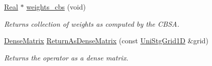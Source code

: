 \begin{DoxyCompactItemize}
\hyperlink{group__c01-roots_gac080bbbf5cbb5502c9f00405f894857d}{Real} $\ast$ \hyperlink{classmtk_1_1Grad1D_adde70cb7e4fd930f84121a4bcd7f2e37}{weights\-\_\-cbs} (void)
\begin{DoxyCompactList}\small\item\em Returns collection of weights as computed by the C\-B\-S\-A. \end{DoxyCompactList}\item 
\hyperlink{classmtk_1_1DenseMatrix}{Dense\-Matrix} \hyperlink{classmtk_1_1Grad1D_a75781c4455569a7934d4e0dff7e06064}{Return\-As\-Dense\-Matrix} (const \hyperlink{classmtk_1_1UniStgGrid1D}{Uni\-Stg\-Grid1\-D} \&grid)
\begin{DoxyCompactList}\small\item\em Returns the operator as a dense matrix. \end{DoxyCompactList}\end{DoxyCompactItemize}

